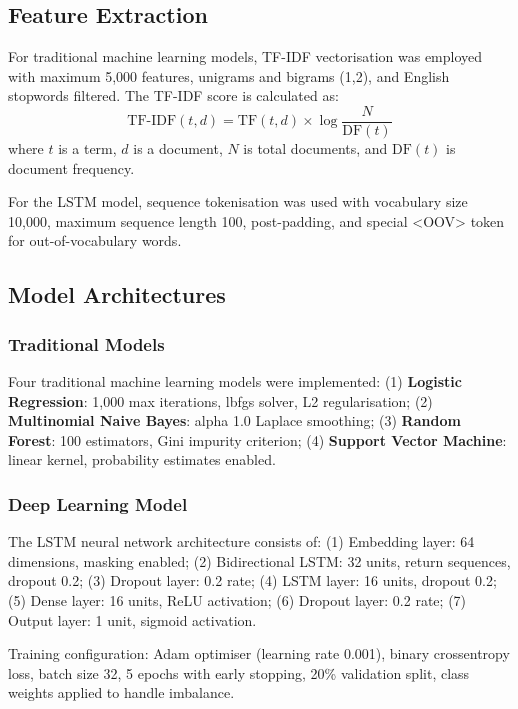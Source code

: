 \documentclass[a4paper,
               ]{jacow}
\begin{document}
\subsection{Feature Extraction}

For traditional machine learning models, TF-IDF vectorisation was employed with maximum 5,000 features, unigrams and bigrams (1,2), and English stopwords filtered. The TF-IDF score is calculated as:
\begin{equation}
    \text{TF-IDF}(t,d) = \text{TF}(t,d) \times \log\frac{N}{\text{DF}(t)}
\end{equation}
where $t$ is a term, $d$ is a document, $N$ is total documents, and $\text{DF}(t)$ is document frequency.

For the LSTM model, sequence tokenisation was used with vocabulary size 10,000, maximum sequence length 100, post-padding, and special <OOV> token for out-of-vocabulary words.

\subsection{Model Architectures}

\subsubsection{Traditional Models}

Four traditional machine learning models were implemented: (1) \textbf{Logistic Regression}: 1,000 max iterations, lbfgs solver, L2 regularisation; (2) \textbf{Multinomial Naive Bayes}: alpha 1.0 Laplace smoothing; (3) \textbf{Random Forest}: 100 estimators, Gini impurity criterion; (4) \textbf{Support Vector Machine}: linear kernel, probability estimates enabled.

\subsubsection{Deep Learning Model}

The LSTM neural network architecture consists of: (1) Embedding layer: 64 dimensions, masking enabled; (2) Bidirectional LSTM: 32 units, return sequences, dropout 0.2; (3) Dropout layer: 0.2 rate; (4) LSTM layer: 16 units, dropout 0.2; (5) Dense layer: 16 units, ReLU activation; (6) Dropout layer: 0.2 rate; (7) Output layer: 1 unit, sigmoid activation.

Training configuration: Adam optimiser (learning rate 0.001), binary crossentropy loss, batch size 32, 5 epochs with early stopping, 20\% validation split, class weights applied to handle imbalance.
\end{document}
